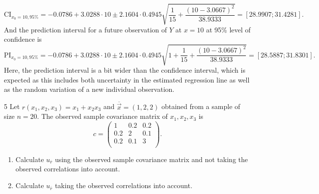 \begin{derivation}
\begin{enumerate}[label=\alph*)]
\begin{equation*}
            \text{CI}_{x_0 = 10, 95\%} = \num{-0,0786} + \num{3,0288} \cdot 10 \pm \num{2,1604} \cdot \num{0,4945} \sqrt{\frac{1}{15} + \frac{(10 - \num{3,0667} )^2}{\num{38,9333} }} = [\num{28,9907}; \num{31.4281}]
          .\end{equation*}
          And the prediction interval for a future observation of $Y$ at $x = 10$ at 95\% level of confidence is
          \begin{equation*}
            \text{PI}_{x_0 = 10, 95\%} =  \num{-0,0786} + \num{3,0288} \cdot 10 \pm \num{2,1604} \cdot \num{0,4945} \sqrt{1 + \frac{1}{15} + \frac{(10 - \num{3,0667} )^2}{\num{38,9333} }}  = [\num{28.5887}; \num{31.8301}]
          .\end{equation*}
          Here, the prediction interval is a bit wider than the confidence interval, which is expected as this includes both uncertainty in the estimated regression line as well as the random variation of a new individual observation.
      \end{enumerate}
    \end{derivation}


    \begin{problem}{5}
      Let $r(x_1,x_2,x_3) = x_1 + x_2x_3$ and $\overline{\Vec{x}} = (1,2,2)$ obtained from a sample of size $n = 20$.
      The observed sample covariance matrix of $x_1,x_2,x_3$ is
      \begin{equation*}
        c = \begin{pmatrix}
          1 & \num{0,2}  & \num{0,2} \\
        \num{0,2}  & 2 & \num{0,1} \\
        \num{0,2}  & \num{0,1}  & 3\\
        \end{pmatrix}
      .\end{equation*}
      \begin{enumerate}[label=\alph*)]
        \item Calculate $u_{\overline{r}}$ using the observed sample covariance matrix and not taking the observed correlations into account.
        \item Calculate $u_{\overline{r}}$ taking the observed correlations into account.
      \end{enumerate}
    \end{problem}

